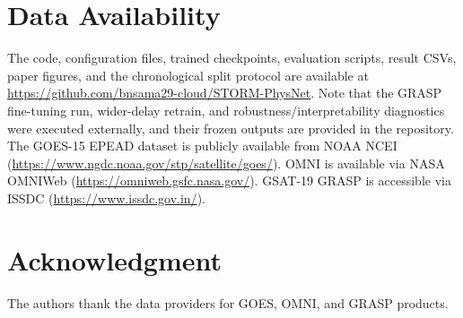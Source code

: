 \documentclass{ieeeaccess}
\begin{document}
\section*{Data Availability}
The code, configuration files, trained checkpoints, evaluation scripts,
result CSVs, paper figures, and the chronological split protocol are
available at
\url{https://github.com/bnsama29-cloud/STORM-PhysNet}. Note that the GRASP fine-tuning run, wider-delay retrain, and robustness/interpretability diagnostics were executed externally, and their frozen outputs are provided in the repository.
The GOES-15 EPEAD dataset is publicly available from NOAA NCEI
(\url{https://www.ngdc.noaa.gov/stp/satellite/goes/}).
OMNI is available via NASA OMNIWeb
(\url{https://omniweb.gsfc.nasa.gov/}).
GSAT-19 GRASP is accessible via ISSDC
(\url{https://www.issdc.gov.in/}).
\section*{Acknowledgment}
The authors thank the data providers for GOES, OMNI, and GRASP products.
\end{document}
